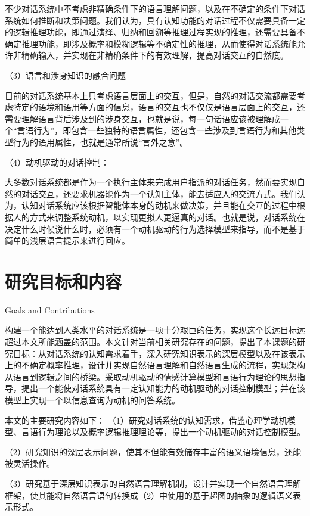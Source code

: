        不少对话系统中不考虑非精确条件下的语言理解问题，以及在不确定的条件下对话系统如何推断和决策问题。我们认为，具有认知功能的对话过程不仅需要具备一定的逻辑推理功能，即通过演绎、归纳和回溯等推理过程实现的推理，还需要具备不确定推理功能，即涉及概率和模糊逻辑等不确定性的推理，从而使得对话系统能允许非精确输入，并实现在非精确条件下的有效理解，提高对话交互的自然度。

（3）语言和涉身知识的融合问题

       目前的对话系统基本上只考虑语言层面上的交互，但是，自然的对话交流都需要考虑特定的语境和语用等方面的信息，语言的交互也不仅仅是语言层面上的交互，还需要理解语言背后涉及到的涉身交互，也就是说，每一句话语应该被理解成一个“言语行为”，即包含一些独特的语言属性，还包含一些涉及到言语行为和其他类型行为的语用属性，也就是通常所说“言外之意”。

（4）动机驱动的对话控制：

     大多数对话系统都是作为一个执行主体来完成用户指派的对话任务，然而要实现自然的对话交互，还要求机器能作为一个认知主体，能去适应人的交流方式。我们认为，认知对话系统应该根据智能体本身的动机来做决策，并且能在交互的过程中根据人的方式来调整系统动机，以实现更拟人更逼真的对话。也就是说，对话系统在决定什么时候说什么时，必须有一个动机驱动的行为选择模型来指导，而不是基于简单的浅层语言提示来进行回应。


\section{研究目标和内容}{Goals and Contributions}

构建一个能达到人类水平的对话系统是一项十分艰巨的任务，实现这个长远目标远超过本文所能涵盖的范围。本文针对当前相关研究存在的问题，提出了本课题的研究目标：从对话系统的认知需求着手，深入研究知识表示的深层模型以及在该表示上的不确定概率推理，设计并实现自然语言理解和自然语言生成的流程，实现架构从语言到逻辑之间的桥梁。采取动机驱动的情感计算模型和言语行为理论的思想指导，提出一个能使对话系统具有一定认知能力的动机驱动的对话控制模型；并在该模型上实现一个以信息查询为动机的问答系统。

       本文的主要研究内容如下：
（1）研究对话系统的认知需求，借鉴心理学动机模型、言语行为理论以及概率逻辑推理理论等，提出一个动机驱动的对话控制模型。

（2）研究知识的深层表示问题，使其不但能有效储存丰富的语义语境信息，还能被灵活操作。

（3）研究基于深层知识表示的自然语言理解机制，设计并实现一个自然语言理解框架，使其能将自然语言语句转换成（2）中使用的基于超图的抽象的逻辑语义表示形式。

